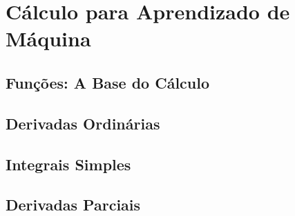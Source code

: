 
\chapter{Cálculo para Aprendizado de Máquina}
\label{cap:calculo-ia}



\section{Funções: A Base do Cálculo}

\section{Derivadas Ordinárias}

\section{Integrais Simples}

\section{Derivadas Parciais}